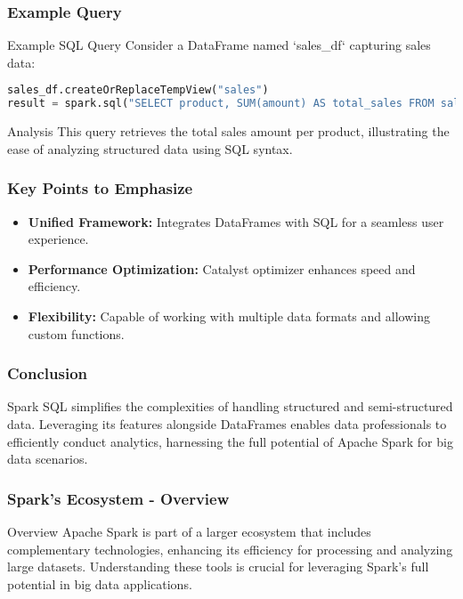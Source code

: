 \documentclass[aspectratio=169]{beamer}
\begin{document}
\begin{frame}[fragile]
    \frametitle{Example Query}
    \begin{block}{Example SQL Query}
        Consider a DataFrame named `sales\_df` capturing sales data:
        \begin{lstlisting}[language=Python]
sales_df.createOrReplaceTempView("sales")
result = spark.sql("SELECT product, SUM(amount) AS total_sales FROM sales GROUP BY product ORDER BY total_sales DESC")
        \end{lstlisting}
    \end{block}
    \begin{block}{Analysis}
        This query retrieves the total sales amount per product, illustrating the ease of analyzing structured data using SQL syntax.
    \end{block}
\end{frame}

\begin{frame}
    \frametitle{Key Points to Emphasize}
    \begin{itemize}
        \item \textbf{Unified Framework:} Integrates DataFrames with SQL for a seamless user experience.
        \item \textbf{Performance Optimization:} Catalyst optimizer enhances speed and efficiency.
        \item \textbf{Flexibility:} Capable of working with multiple data formats and allowing custom functions.
    \end{itemize}
\end{frame}

\begin{frame}
    \frametitle{Conclusion}
    Spark SQL simplifies the complexities of handling structured and semi-structured data. Leveraging its features alongside DataFrames enables data professionals to efficiently conduct analytics, harnessing the full potential of Apache Spark for big data scenarios.
\end{frame}

\begin{frame}[fragile]
    \frametitle{Spark's Ecosystem - Overview}
    \begin{block}{Overview}
        Apache Spark is part of a larger ecosystem that includes complementary technologies, enhancing its efficiency for processing and analyzing large datasets. 
        Understanding these tools is crucial for leveraging Spark's full potential in big data applications.
    \end{block}
\end{frame}
\end{document}
